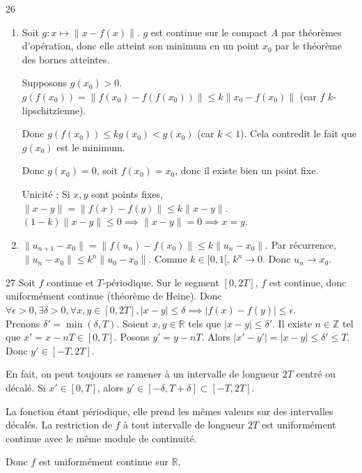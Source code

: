 \begin{correction}{26}
\begin{enumerate}
    \item Soit $g : x \mapsto \|x-f(x)\|$. $g$ est continue sur le compact $A$ par théorèmes d'opération, donc elle atteint son minimum en un point $x_{0}$ par le théorème des bornes atteintes.

    Supposons $g(x_{0}) > 0$.
    $g(f(x_{0})) = \|f(x_{0}) - f(f(x_{0}))\| \le k \|x_{0} - f(x_{0})\|$ (car $f$ $k$-lipschitzienne).

    Donc $g(f(x_{0})) \le k g(x_{0}) < g(x_{0})$ (car $k < 1$).
    Cela contredit le fait que $g(x_{0})$ est le minimum.

    Donc $g(x_{0}) = 0$, soit $f(x_{0}) = x_{0}$, donc il existe bien un point fixe.
    
    Unicité : Si $x, y$ sont points fixes, $\|x-y\| = \|f(x)-f(y)\| \le k \|x-y\|$.
    $(1-k)\|x-y\| \le 0 \implies \|x-y\| = 0 \implies x=y$.

    \item $\|u_{n+1} - x_{0}\| = \|f(u_{n}) - f(x_{0})\| \le k \|u_{n} - x_{0}\|$.
    Par récurrence, $\|u_{n} - x_{0}\| \le k^{n} \|u_{0} - x_{0}\|$.
    Comme $k \in [0,1[$, $k^{n} \to 0$. Donc $u_{n} \to x_{0}$.
\end{enumerate}
\end{correction}

\begin{correction}{27}
Soit $f$ continue et $T$-périodique.
Sur le segment $[0, 2T]$, $f$ est continue, donc uniformément continue (théorème de Heine).
Donc $\forall \epsilon > 0, \exists \delta > 0, \forall x,y \in [0, 2T], |x-y| \le \delta \implies |f(x)-f(y)| \le \epsilon$. \\

Prenons $\delta' = \min(\delta, T)$.
Soient $x, y \in \mathbb{R}$ tels que $|x-y| \le \delta'$.
Il existe $n \in \mathbb{Z}$ tel que $x' = x - nT \in [0, T]$.
Posons $y' = y - nT$. Alors $|x'-y'| = |x-y| \le \delta' \le T$.
Donc $y' \in [-T, 2T]$.

En fait, on peut toujours se ramener à un intervalle de longueur $2T$ centré ou décalé.
Si $x' \in [0, T]$, alors $y' \in [-\delta, T+\delta] \subset [-T, 2T]$.

La fonction étant périodique, elle prend les mêmes valeurs sur des intervalles décalés.
La restriction de $f$ à tout intervalle de longueur $2T$ est uniformément continue avec le même module de continuité.

Donc $f$ est uniformément continue sur $\mathbb{R}$.
\end{correction}

